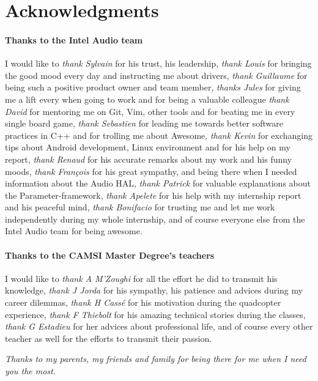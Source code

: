 \chapter*{Acknowledgments}

\subsubsection*{Thanks to the Intel Audio team}
I would like to
\emph{thank Sylvain} for his trust, his leadership,
\emph{thank Louis} for bringing the good mood every day and instructing me about drivers,
\emph{thank Guillaume} for being such a positive product owner and team member,
\emph{thanks Jules} for giving me a lift every when going to work and for being a valuable colleague
\emph{thank David} for mentoring me on Git, Vim, other tools and for beating me in every single board game,
\emph{thank Sebastien} for leading me towards better software practices in C++ and for trolling me about Awesome,
\emph{thank Kevin} for exchanging tips about Android development, Linux environment and for his help on my report,
\emph{thank Renaud} for his accurate remarks about my work and his funny moods,
\emph{thank François} for his great sympathy, and being there when I needed information about the Audio HAL,
\emph{thank Patrick} for valuable explanations about the Parameter-framework,
\emph{thank Apelete} for his help with my internship report and his peaceful mind,
\emph{thank Bonifacio} for trusting me and let me work independently during my whole internship,
and of course everyone else from the Intel Audio team for being awesome.

\subsubsection*{Thanks to the CAMSI Master Degree's teachers}
I would like to
\emph{thank A M'Zoughi} for all the effort he did to transmit his knowledge,
\emph{thank J Jorda} for his sympathy, his patience and advices during my career dilemmas,
\emph{thank H Cassé} for his motivation during the quadcopter experience,
\emph{thank F Thiebolt} for his amazing technical stories during the classes,
\emph{thank G Estadieu} for her advices about professional life,
and of course every other teacher as well for the efforts to transmit their passion.

\vfill

\begin{minipage}{0.49\textwidth}
\begin{flushright}
\end{flushright}
\end{minipage}
\begin{minipage}{0.49\textwidth}
\begin{flushleft}
  \emph{Thanks to my parents, my friends and family for being there for me when I need you the most.}
\end{flushleft}
\end{minipage}
